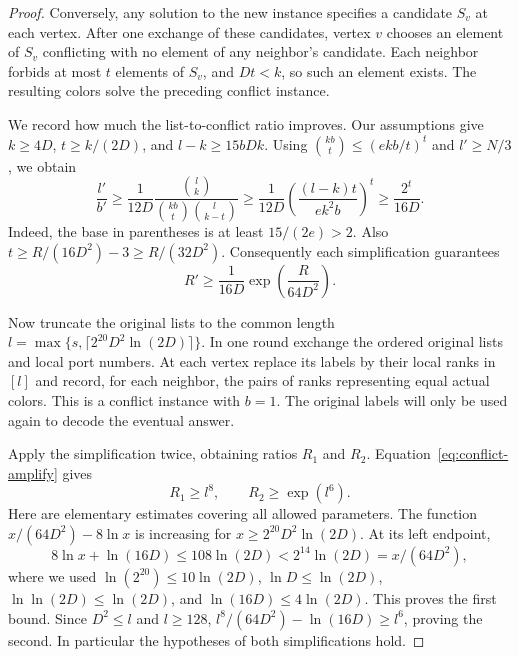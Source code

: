 \documentclass[11pt]{article}
\theoremstyle{definition}
\theoremstyle{remark}
\begin{document}
\begin{proof}
Conversely, any solution to the new instance specifies a candidate
$S_v$ at each vertex.  After one exchange of these candidates, vertex
$v$ chooses an element of $S_v$ conflicting with no element of any
neighbor's candidate.  Each neighbor forbids at most $t$ elements
of $S_v$, and $Dt<k$, so such an element exists.  The resulting
colors solve the preceding conflict instance.

We record how much the list-to-conflict ratio improves.  Our assumptions
give $k\ge4D$, $t\ge k/(2D)$, and $l-k\ge15bDk$.
Using $\binom{kb}{t}\le(ekb/t)^t$ and $l'\ge N/3$, we obtain
\[
 \frac{l'}{b'}
 \ge\frac1{12D}\frac{\binom lk}
          {\binom{kb}{t}\binom l{k-t}}
 \ge\frac1{12D}
       \left(\frac{(l-k)t}{ek^2b}\right)^t
 \ge\frac{2^t}{16D}.
\]
Indeed, the base in parentheses is at least $15/(2e)>2$.
Also
$t\ge R/(16D^2)-3\ge R/(32D^2)$.
Consequently each simplification guarantees
\begin{equation}\label{eq:conflict-amplify}
 R'\ge\frac1{16D}\exp\left(\frac{R}{64D^2}\right).
\end{equation}

Now truncate the original lists to the common length
$l=\max\{s,\lceil2^{20}D^2\ln(2D)\rceil\}$.
In one round exchange the ordered original lists and local port numbers.
At each vertex
replace its labels by their local ranks in $[l]$ and record, for each
neighbor, the pairs of ranks representing equal actual colors.
This is a conflict instance with $b=1$.  The original labels will only
be used again to decode the eventual answer.

Apply the simplification twice, obtaining ratios $R_1$ and $R_2$.
Equation~\eqref{eq:conflict-amplify} gives
\[
 R_1\ge l^8,
 \qquad R_2\ge\exp(l^6).
\]
Here are elementary estimates covering all allowed parameters.
The function $x/(64D^2)-8\ln x$ is increasing for
$x\ge2^{20}D^2\ln(2D)$.  At its left endpoint,
\[
 8\ln x+\ln(16D)
 \le108\ln(2D)
 <2^{14}\ln(2D)=x/(64D^2),
\]
where we used
$\ln(2^{20})\le10\ln(2D)$,
$\ln D\le\ln(2D)$,
$\ln\ln(2D)\le\ln(2D)$, and
$\ln(16D)\le4\ln(2D)$.
This proves the first bound.  Since $D^2\le l$ and $l\ge128$,
$l^8/(64D^2)-\ln(16D)\ge l^6$, proving the second.
In particular the hypotheses of both simplifications hold.


\end{proof}
\end{document}
